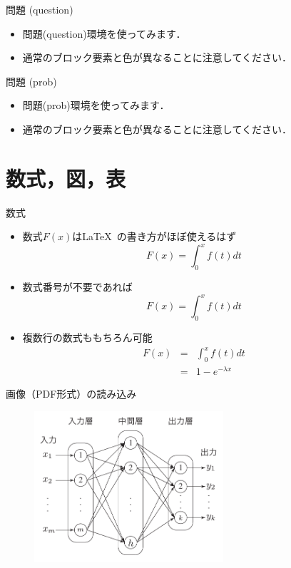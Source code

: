 \begin{frame}{問題 (question)}
  \begin{question}
    \begin{itemize}
      \item 問題(question)環境を使ってみます．
      \item 通常のブロック要素と色が異なることに注意してください．
    \end{itemize}
  \end{question}
\end{frame}

\begin{frame}{問題 (prob)}
  \begin{prob}
    \begin{itemize}
      \item 問題(prob)環境を使ってみます．
      \item 通常のブロック要素と色が異なることに注意してください．
    \end{itemize}
  \end{prob}
\end{frame}

\section{数式，図，表}

\begin{frame}{数式}
  \begin{itemize}
    \item 数式$F(x)$は\LaTeX~の書き方がほぼ使えるはず
    \begin{equation}
      F(x) = \int_{0}^{x}f(t)dt
    \end{equation}
    \item 数式番号が不要であれば
    \begin{equation*}
      F(x) = \int_{0}^{x}f(t)dt
    \end{equation*}
    \item 複数行の数式ももちろん可能
    \begin{eqnarray*}
      F(x) &=& \int_{0}^{x}f(t)dt \\
      &=& 1 - e^{-\lambda x}
    \end{eqnarray*}
  \end{itemize}
\end{frame}

\begin{frame}{画像（PDF形式）の読み込み}
  \begin{figure}
    \includegraphics[width=70mm]{figs/nn.pdf}
  \end{figure}
\end{frame}


